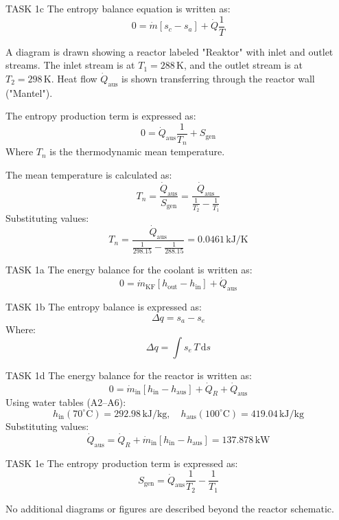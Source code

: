 TASK 1c  
The entropy balance equation is written as:  
\[
0 = \dot{m} \left[ s_c - s_a \right] + \dot{Q} \frac{1}{T}
\]  

A diagram is drawn showing a reactor labeled "Reaktor" with inlet and outlet streams. The inlet stream is at \( T_1 = 288 \, \text{K} \), and the outlet stream is at \( T_2 = 298 \, \text{K} \). Heat flow \( \dot{Q}_{\text{aus}} \) is shown transferring through the reactor wall ("Mantel").  

The entropy production term is expressed as:  
\[
0 = \dot{Q}_{\text{aus}} \frac{1}{T_n} + S_{\text{gen}}
\]  
Where \( T_n \) is the thermodynamic mean temperature.  

The mean temperature is calculated as:  
\[
T_n = \frac{\dot{Q}_{\text{aus}}}{S_{\text{gen}}} = \frac{\dot{Q}_{\text{aus}}}{\frac{1}{T_2} - \frac{1}{T_1}}
\]  
Substituting values:  
\[
T_n = \frac{\dot{Q}_{\text{aus}}}{\frac{1}{298.15} - \frac{1}{288.15}} = 0.0461 \, \text{kJ/K}
\]  

TASK 1a  
The energy balance for the coolant is written as:  
\[
0 = \dot{m}_{\text{KF}} \left[ h_{\text{out}} - h_{\text{in}} \right] + \dot{Q}_{\text{aus}}
\]  

TASK 1b  
The entropy balance is expressed as:  
\[
\Delta q = s_a - s_e
\]  
Where:  
\[
\Delta q = \int s_e \, T \, \text{d}s
\]  

TASK 1d  
The energy balance for the reactor is written as:  
\[
0 = \dot{m}_{\text{in}} \left[ h_{\text{in}} - h_{\text{aus}} \right] + \dot{Q}_R + \dot{Q}_{\text{aus}}
\]  
Using water tables (A2–A6):  
\[
h_{\text{in}} (70^\circ\text{C}) = 292.98 \, \text{kJ/kg}, \quad h_{\text{aus}} (100^\circ\text{C}) = 419.04 \, \text{kJ/kg}
\]  
Substituting values:  
\[
\dot{Q}_{\text{aus}} = \dot{Q}_R + \dot{m}_{\text{in}} \left[ h_{\text{in}} - h_{\text{aus}} \right] = 137.878 \, \text{kW}
\]  

TASK 1e  
The entropy production term is expressed as:  
\[
S_{\text{gen}} = \dot{Q}_{\text{aus}} \frac{1}{T_2} - \frac{1}{T_1}
\]  

No additional diagrams or figures are described beyond the reactor schematic.